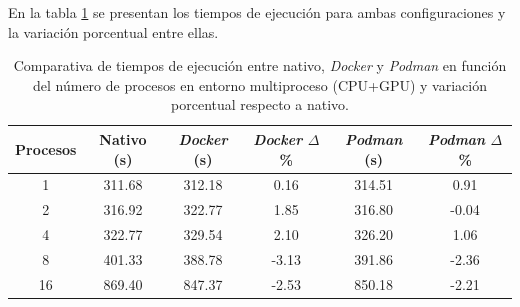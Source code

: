 En la tabla \ref{tab:multi-node_ubuntu_container_vs_native_gpu} se presentan los tiempos de ejecución para ambas configuraciones y la variación porcentual entre ellas.

\begin{table}[ht]
    \centering
    \small
    \setlength{\tabcolsep}{4pt}
    \renewcommand{\arraystretch}{1.1}
    \begin{tabular}{|c|c|c|c|c|c|}
        \hline
        \textbf{Procesos} & \textbf{Nativo (s)} & \textbf{\textit{Docker} (s)} & \textbf{\textit{Docker} $\Delta$\%} & \textbf{\textit{Podman} (s)} & \textbf{\textit{Podman} $\Delta$\%} \\
        \hline
        1                 & 311.68              & 312.18                       & 0.16                                & 314.51                       & 0.91                                \\
        2                 & 316.92              & 322.77                       & 1.85                                & 316.80                       & -0.04                               \\
        4                 & 322.77              & 329.54                       & 2.10                                & 326.20                       & 1.06                                \\
        8                 & 401.33              & 388.78                       & -3.13                               & 391.86                       & -2.36                               \\
        16                & 869.40              & 847.37                       & -2.53                               & 850.18                       & -2.21                               \\
        \hline
    \end{tabular}
    \caption{Comparativa de tiempos de ejecución entre nativo, \textit{Docker} y \textit{Podman} en función del número de procesos en entorno multiproceso (CPU+GPU) y variación porcentual respecto a nativo.}
    \label{tab:multi-node_ubuntu_container_vs_native_gpu}
\end{table}

